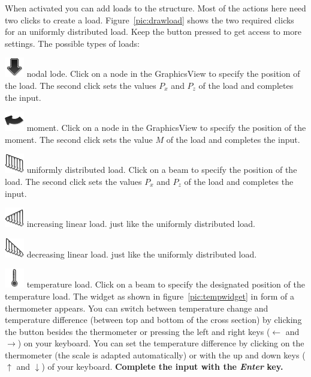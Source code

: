 \documentclass[a4paper,11pt]{report}
\begin{document}
\begin{minipage}[h]{\textwidth-4cm}
When activated you can add loads to the structure. Most of the actions here need two clicks to create a load. Figure~\ref{pic:drawload} shows the two required clicks for an uniformly distributed load. Keep the button pressed to get access to more settings. The possible types of loads:
\begin{trivlist}
	\item[] \includegraphics[scale = 0.5]{../../icons/load.png} nodal lode. Click on a node in the GraphicsView to specify the position of the load. The second click sets the values $P_x$ and $P_z$ of the load and completes the input.
	\item[] \includegraphics[scale = 0.5]{../../icons/moment.png} moment. Click on a node in the GraphicsView to specify the position of the moment. The second click sets the value $M$ of the load and completes the input.
	\item[] \includegraphics[scale = 0.5]{../../icons/ustload.png} uniformly distributed load. Click on a beam to specify the position of the load. The second click sets the values $P_x$ and $P_z$ of the load and completes the input.
	\item[] \includegraphics[scale = 0.5]{../../icons/istload.png} increasing linear load. just like the uniformly distributed load.
	\item[] \includegraphics[scale = 0.5]{../../icons/dstload.png} decreasing linear load. just like the uniformly distributed load.
	\item[] \includegraphics[scale = 0.5]{../../icons/temp.png} temperature load. Click on a beam to specify the designated position of the temperature load. The widget as shown in figure~\ref{pic:tempwidget} in form of a thermometer appears. You can switch between temperature change and temperature difference (between top and bottom of the cross section) by clicking the button besides the thermometer or pressing the left and right keys ($\leftarrow$ and $\rightarrow$) on your keyboard. You can set the temperature difference by clicking on the thermometer (the scale is adapted automatically) or with the up and down keys ($\uparrow$ and $\downarrow$) of your keyboard. \textbf{Complete the input with the \textit{Enter} key.}

\end{trivlist}
\end{minipage}
\end{document}
